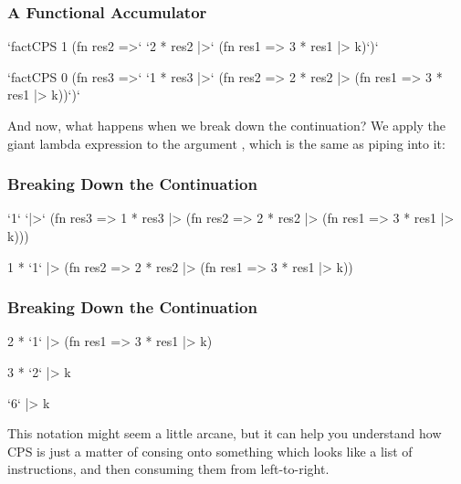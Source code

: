 \documentclass[aspectratio=169]{beamer}
\begin{document}
\begin{frame}[fragile]
  \frametitle{A Functional Accumulator}

  \begin{codeblock}
    `factCPS 1    (fn res2 =>`
    `2 * res2  |>` (fn res1 =>
    3 * res1  |> k)`)`
  \end{codeblock}

  \pause
  \vspace{\fill}

  \begin{codeblock}
    `factCPS 0    (fn res3 =>`
    `1 * res3  |>` (fn res2 =>
    2 * res2  |> (fn res1 =>
    3 * res1  |> k))`)`
  \end{codeblock}

  And now, what happens when we break down the continuation? We apply the
  giant lambda expression to the argument , which is the same as
  piping  into it:
\end{frame}

\begin{frame}[fragile]
  \frametitle{Breaking Down the Continuation}

  \begin{codeblock}
    `1`         `|>` (fn res3 =>
    1 * res3  |> (fn res2 =>
    2 * res2  |> (fn res1 =>
    3 * res1  |> k)))
  \end{codeblock}

  \pause
  \vspace{\fill}

  \begin{codeblock}
    1 * `1`     |> (fn res2 =>
    2 * res2  |> (fn res1 =>
    3 * res1  |> k))
  \end{codeblock}
\end{frame}

\begin{frame}[fragile]
  \frametitle{Breaking Down the Continuation}

  \begin{codeblock}
    2 * `1`     |> (fn res1 =>
    3 * res1  |> k)
  \end{codeblock}

  \pause
  \vspace{\fill}

  \begin{codeblock}
    3 * `2`     |> k
  \end{codeblock}

  \pause
  \vspace{\fill}

  \begin{codeblock}
    `6`         |> k
  \end{codeblock}

  \pause
  \vspace{\fill}

  This notation might seem a little arcane, but it can help you understand how
  CPS is just a matter of consing onto something which looks like a list of
  instructions, and then consuming them from left-to-right.
\end{frame}
\end{document}
